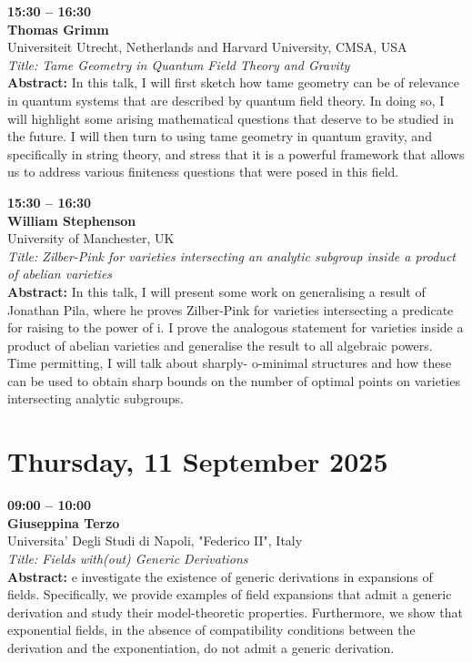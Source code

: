 \documentclass[10pt,a4paper]{article}
\begin{document}
\begin{tcolorbox}[talkbox]
\textbf{15:30 -- 16:30} \\
\textbf{Thomas Grimm} \\
Universiteit Utrecht, Netherlands and Harvard University, CMSA, USA \\
\textit{Title: Tame Geometry in Quantum Field Theory and Gravity} \\
\textbf{Abstract:} In this talk, I will first sketch how tame geometry can be of relevance in quantum systems that are described by quantum field theory. In doing so, I will highlight some arising mathematical questions that deserve to be studied in the future. I will then turn to using tame geometry in quantum gravity, and specifically in string theory, and stress that it is a powerful framework that allows us to address various finiteness questions that were posed in this field. 
\end{tcolorbox}
\begin{tcolorbox}[talkbox]
\textbf{15:30 -- 16:30} \\
\textbf{William Stephenson} \\
University of Manchester, UK \\
\textit{Title: Zilber-Pink for varieties intersecting an analytic subgroup inside a product of abelian varieties} \\
\textbf{Abstract:} In this talk, I will present some work on generalising a result of Jonathan Pila, where he proves Zilber-Pink for varieties intersecting a predicate for raising to the power of i. I prove the analogous statement for varieties inside a product of abelian varieties and generalise the result to all algebraic powers. Time permitting, I will talk about sharply- o-minimal structures and how these can be used to obtain sharp bounds on the number of optimal points on varieties intersecting analytic subgroups.
\end{tcolorbox}

\newpage

\section{Thursday, 11 September 2025}

\begin{tcolorbox}[talkbox]
\textbf{09:00 -- 10:00} \\
\textbf{Giuseppina Terzo} \\
Universita' Degli Studi di Napoli, "Federico II", Italy \\
\textit{Title: Fields with(out) Generic Derivations} \\
\textbf{Abstract:} e investigate the existence of generic derivations in expansions of fields. Specifically, we provide examples of field expansions that admit a generic derivation and study their model-theoretic properties. Furthermore, we show that exponential fields, in the absence of compatibility conditions between the derivation and the exponentiation, do not admit a generic derivation.
\end{tcolorbox}
\end{document}
